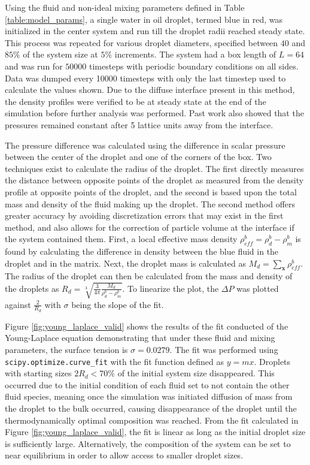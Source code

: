 Using the fluid and non-ideal mixing parameters defined in Table \ref{table:model_params}, a single water in oil droplet, termed blue in red, was initialized in the center system and run till the droplet radii reached steady state. This process was repeated for various droplet diameters, specified between $40$ and $85 \%$ of the system size at $5\%$ increments. The system had a box length of $L = 64$ and was run for $50000$ timesteps with periodic boundary conditions on all sides. Data was dumped every 10000 timesteps with only the last timestep used to calculate the values shown. Due to the diffuse interface present in this method, the density profiles were verified to be at steady state at the end of the simulation before further analysis was performed. \cite{frijters_effects_2012} Past work also showed that the pressures remained constant after 5 lattice units away from the interface. \cite{frijters_effects_2012} 

The pressure difference was calculated using the difference in scalar pressure between the center of the droplet and one of the corners of the box. Two techniques exist to calculate the radius of the droplet. The first directly measures the distance between opposite points of the droplet as measured from the density profile at opposite points of the droplet, and the second is based upon the total mass and density of the fluid making up the droplet. The second method offers greater accuracy by avoiding discretization errors that may exist in the first method, and also allows for the correction of particle volume at the interface if the system contained them. First, a local effective mass density $\rho^b_{eff} = \rho^{b}_{d} - \rho^{b}_{m}$ is found by calculating the difference in density between the blue fluid in the droplet and in the matrix. Next, the droplet mass is calculated as $M_d = \sum_{\mathbf{x}}{\rho_{eff}^{b}}$. The radius of the droplet can then be calculated from the mass and density of the droplets as $R_d = \sqrt[3]{\frac{3}{4\pi} \frac{M_d}{\rho^b_d - \rho^b_m}}$. To linearize the plot, the $\Delta P$ was plotted against $\frac{2}{R_d}$ with $\sigma$ being the slope of the fit.

Figure \ref{fig:young_laplace_valid} shows the results of the fit conducted of the Young-Laplace equation demonstrating that under these fluid and mixing parameters, the surface tension is $\sigma = 0.0279$. The fit was performed using \texttt{scipy.optimize.curve\_fit} with the fit function defined as $y = mx$. Droplets with starting sizes $2R_d < 70\%$ of the initial system size disappeared. This occurred due to the initial condition of each fluid set to not contain the other fluid species, meaning once the simulation was initiated diffusion of mass from the droplet to the bulk occurred, causing disappearance of the droplet until the thermodynamically optimal composition was reached. From the fit calculated in Figure \ref{fig:young_laplace_valid}, the fit is linear as long as the initial droplet size is sufficiently large. Alternatively, the composition of the system can be set to near equilibrium in order to allow access to smaller droplet sizes.

